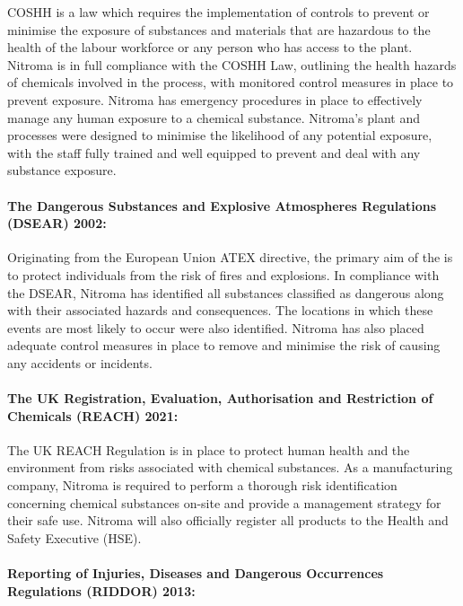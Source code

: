 COSHH is a law which requires the implementation of controls to prevent or minimise the exposure of substances and materials that are hazardous to the health of the labour workforce or any person who has access to the plant. Nitroma is in full compliance with the COSHH Law, outlining the health hazards of chemicals involved in the process, with monitored control measures in place to prevent exposure. Nitroma has emergency procedures in place to effectively manage any human exposure to a chemical substance. Nitroma’s plant and processes were designed to minimise the likelihood of any potential exposure, with the staff fully trained and well equipped to prevent and deal with any substance exposure. 

\paragraph{The Dangerous Substances and Explosive Atmospheres Regulations (DSEAR) 2002:}

Originating from the European Union ATEX directive, the primary aim of the is to protect individuals from the risk of fires and explosions. In compliance with the DSEAR, Nitroma has identified all substances classified as dangerous along with their associated hazards and consequences. The locations in which these events are most likely to occur were also identified. Nitroma has also placed adequate control measures in place to remove and minimise the risk of causing any accidents or incidents. 

\paragraph{The UK Registration, Evaluation, Authorisation and Restriction of Chemicals (REACH) 2021:}

The UK REACH Regulation is in place to protect human health and the environment from risks associated with chemical substances. As a manufacturing company, Nitroma is required to perform a thorough risk identification concerning chemical substances on-site and provide a management strategy for their safe use. Nitroma will also officially register all products to the Health and Safety Executive (HSE). 

\paragraph{Reporting of Injuries, Diseases and Dangerous Occurrences Regulations (RIDDOR) 2013:}

